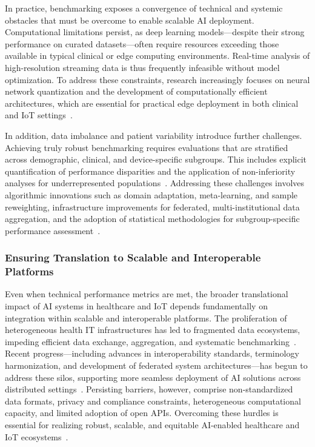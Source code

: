 \documentclass[sigconf]{acmart}
\begin{document}
In practice, benchmarking exposes a convergence of technical and systemic obstacles that must be overcome to enable scalable AI deployment. Computational limitations persist, as deep learning models—despite their strong performance on curated datasets—often require resources exceeding those available in typical clinical or edge computing environments. Real-time analysis of high-resolution streaming data is thus frequently infeasible without model optimization. To address these constraints, research increasingly focuses on neural network quantization and the development of computationally efficient architectures, which are essential for practical edge deployment in both clinical and IoT settings~\cite{ref98,ref102,ref103,ref106}.
 
In addition, data imbalance and patient variability introduce further challenges. Achieving truly robust benchmarking requires evaluations that are stratified across demographic, clinical, and device-specific subgroups. This includes explicit quantification of performance disparities and the application of non-inferiority analyses for underrepresented populations~\cite{ref89,ref106}. Addressing these challenges involves algorithmic innovations such as domain adaptation, meta-learning, and sample reweighting, infrastructure improvements for federated, multi-institutional data aggregation, and the adoption of statistical methodologies for subgroup-specific performance assessment~\cite{ref102,ref103}.

\subsubsection{Ensuring Translation to Scalable and Interoperable Platforms}

Even when technical performance metrics are met, the broader translational impact of AI systems in healthcare and IoT depends fundamentally on integration within scalable and interoperable platforms. The proliferation of heterogeneous health IT infrastructures has led to fragmented data ecosystems, impeding efficient data exchange, aggregation, and systematic benchmarking~\cite{ref33,ref35,ref46,ref65}. Recent progress—including advances in interoperability standards, terminology harmonization, and development of federated system architectures—has begun to address these silos, supporting more seamless deployment of AI solutions across distributed settings~\cite{ref35,ref46,ref47}. Persisting barriers, however, comprise non-standardized data formats, privacy and compliance constraints, heterogeneous computational capacity, and limited adoption of open APIs. Overcoming these hurdles is essential for realizing robust, scalable, and equitable AI-enabled healthcare and IoT ecosystems~\cite{ref34,ref65}.
\end{document}
